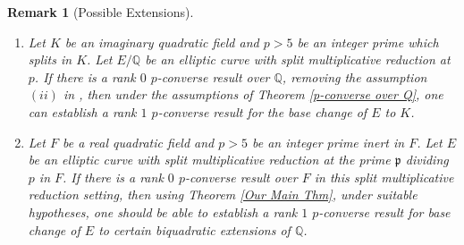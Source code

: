 \documentclass[reqno,10pt]{amsart}
\newcommand{\q}{\mathbb{Q}}
\newcommand{\z}{\mathbb{Z}}
\newcommand{\p}{\mathfrak{p}}
\newcommand{\n}{\mathfrak{n}}
\newcommand{\Varpi}{\rotatebox[origin=c]{180}{$\Pi\kern-0.361em\Pi$}}
\theoremstyle{plain}
\newtheorem{cor}[thm]{Corollary}
\newtheorem{rem}[thm]{Remark}
\theoremstyle{definition}
\begin{document}


\begin{rem}[Possible Extensions]\label{possible-extensions}
    \begin{enumerate}
        \item Let $K$ be an imaginary quadratic field and $p >5 $ be an integer prime which splits in $K$. Let $E/\q$ be an elliptic curve with split multiplicative reduction at $p$.  If there is a rank $0$ $p$-converse result over $\q$, removing the assumption $(ii)$ in  \cite[Theorem C]{SkinnerRank0}, then under the assumptions of Theorem \ref{p-converse over Q}, one can establish a rank $1$ $p$-converse result for the base change of $E$ to $K$.

        \item Let $F$ be a real quadratic field and $p >5 $ be an integer prime inert in $F$. Let $E$ be an elliptic curve with split multiplicative reduction at the prime $\p$ dividing $p$ in $F$.  If there is a rank $0$ $p$-converse result over $F$ in this split multiplicative reduction setting, then using Theorem \ref{Our Main Thm}, under suitable hypotheses, one should be able to establish a rank $1$ $p$-converse result for base change of $E$ to  certain biquadratic extensions of $\q$.
    \end{enumerate}
\end{rem}
\end{document}
